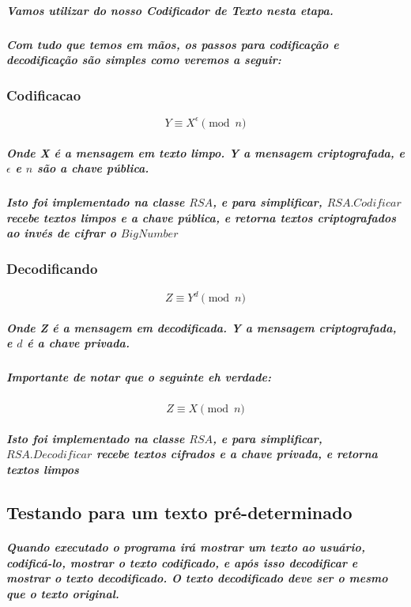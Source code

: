 \documentclass[12pt,twoside, a4paper, twocolumn]{article}
\begin{document}
\subparagraph*{Vamos utilizar do nosso \emph{Codificador de Texto} nesta etapa.}

\subparagraph*{Com tudo que temos em mãos, os passos para codificação e decodificação são simples como veremos a seguir:}

\subsubsection{Codificacao}

\begin{equation}
    Y \equiv X^{\epsilon} \pmod{n}
\end{equation}

\subparagraph*{Onde X é a mensagem em texto limpo. Y a mensagem criptografada, e $\epsilon$ e $n$ são a chave pública.}

\subparagraph*{Isto foi implementado na classe $RSA$, e para simplificar, $RSA.Codificar$ recebe textos limpos e a chave pública, e retorna textos criptografados ao invés de cifrar o $BigNumber$}

\subsubsection{Decodificando}

\begin{equation}
    Z \equiv Y^{d} \pmod{n}
\end{equation}

\subparagraph*{Onde Z é a mensagem em decodificada. Y a mensagem criptografada, e $d$ é a chave privada.}

\subparagraph*{Importante de notar que o seguinte eh verdade:}

\begin{equation}
    Z \equiv X \pmod{n}
\end{equation}

\subparagraph*{Isto foi implementado na classe $RSA$, e para simplificar, $RSA.Decodificar$ recebe textos cifrados e a chave privada, e retorna textos limpos}

\subsection{Testando para um texto pré-determinado}

\subparagraph*{Quando executado o programa irá mostrar um texto ao usuário, codificá-lo, mostrar o texto codificado, e após isso decodificar e mostrar o texto decodificado. O texto decodificado deve ser o mesmo que o texto original.}
\end{document}
